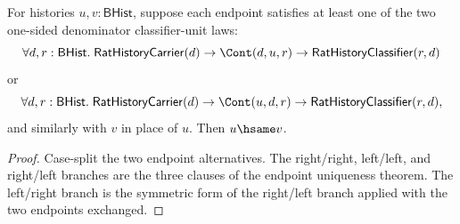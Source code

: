 \begin{theorem}
\label{thm:field-rat-denominator-external-unit-endpoint-disjunction-unique}
For histories $u,v:\mathsf{BHist}$, suppose each endpoint satisfies at least
one of the two one-sided denominator classifier-unit laws:
$$
\forall d,r:\mathsf{BHist}.\;
\mathsf{RatHistoryCarrier}(d)\to
\Cont(d,u,r)\to
\mathsf{RatHistoryClassifier}(r,d)
$$
or
$$
\forall d,r:\mathsf{BHist}.\;
\mathsf{RatHistoryCarrier}(d)\to
\Cont(u,d,r)\to
\mathsf{RatHistoryClassifier}(r,d),
$$
and similarly with $v$ in place of $u$. Then $u\hsame v$.
\end{theorem}
\begin{proof}
Case-split the two endpoint alternatives. The right/right, left/left, and
right/left branches are the three clauses of the endpoint uniqueness theorem.
The left/right branch is the symmetric form of the right/left branch applied
with the two endpoints exchanged.
\end{proof}

